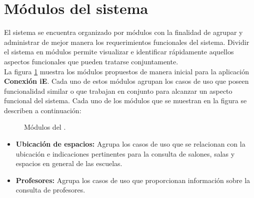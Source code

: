 
\section{Módulos del sistema}

    El sistema se encuentra organizado por módulos con la finalidad de agrupar y administrar de mejor manera los requerimientos funcionales del sistema. Dividir el sistema en módulos permite visualizar e identificar rápidamente aquellos aspectos funcionales que pueden tratarse conjuntamente. \\

    La figura \ref{fig:ModulosPAEAR} muestra los módulos propuestos de manera inicial para la aplicación \textbf{Conexión iE}. Cada uno de estos módulos agrupan los casos de uso que poseen funcionalidad similar o que trabajan en conjunto para alcanzar un aspecto funcional del sistema. Cada uno de los módulos que se muestran en la figura se describen a continuación:


    \begin{figure}[h!]
	\begin{center}
	\caption{Módulos del \saear.}
	\label{fig:ModulosPAEAR}
	\end{center}
    \end{figure}

    \begin{itemize}
	\item {\bf Ubicación de espacios:} Agrupa los casos de uso que se relacionan con la ubicación e indicaciones pertinentes para la consulta de salones, salas y espacios en general de las escuelas.

	\item {\bf Profesores:} Agrupa los casos de uso que proporcionan información sobre la consulta de profesores. 



    \end{itemize}

